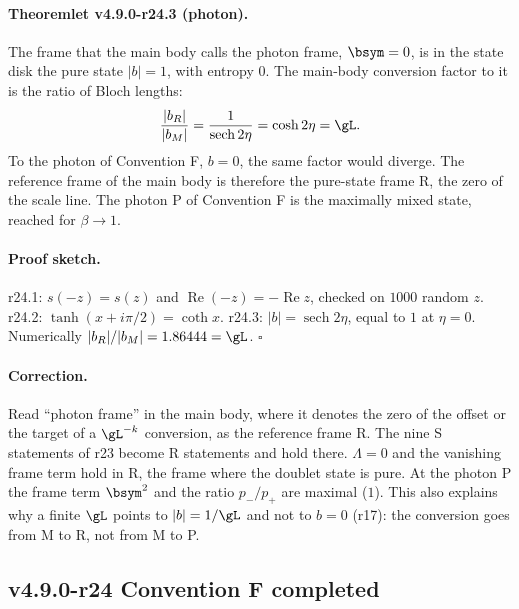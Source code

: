 \paragraph{Theoremlet v4.9.0-r24.3 (photon).}
The frame that the main body calls the photon frame, \(\bsym=0\), is in the state disk the pure state \(|b|=1\), with entropy \(0\).
The main-body conversion factor to it is the ratio of Bloch lengths:
\[
\frac{|b_R|}{|b_M|}=\frac{1}{\operatorname{sech}2\eta}=\cosh2\eta=\gL .
\]
To the photon of Convention F, \(b=0\), the same factor would diverge.  The reference frame of the main body is therefore the
pure-state frame R, the zero of the scale line.  The photon P of Convention F is the maximally mixed state, reached for
\(\beta\to1\).

\paragraph{Proof sketch.}
r24.1: \(s(-z)=s(z)\) and \(\operatorname{Re}(-z)=-\operatorname{Re}z\), checked on \(1000\) random \(z\).  r24.2: \(\tanh(x+i\pi/2)=\coth x\).
r24.3: \(|b|=\operatorname{sech}2\eta\), equal to \(1\) at \(\eta=0\).  Numerically \(|b_R|/|b_M|=1.86444=\gL\).  \(\square\)

\paragraph{Correction.}
Read ``photon frame'' in the main body, where it denotes the zero of the offset or the target of a \(\gL^{-k}\) conversion, as the
reference frame R.  The nine S statements of r23 become R statements and hold there.  \(\Lambda=0\) and the vanishing frame term
hold in R, the frame where the doublet state is pure.  At the photon P the frame term \(\bsym^2\) and the ratio \(p_-/p_+\) are
maximal (\(1\)).  This also explains why a finite \(\gL\) points to \(|b|=1/\gL\) and not to \(b=0\) (r17): the conversion goes from M to
R, not from M to P.

\subsection*{v4.9.0-r24 Convention F completed}
\label{subsec:v490-r24-convention}

